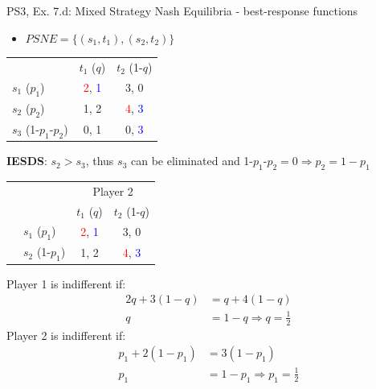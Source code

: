 \begin{frame}{PS3, Ex. 7.d: Mixed Strategy Nash Equilibria - best-response functions}
  \begin{multicols}{2}
    \begin{itemize}
      \item[(d)] $PSNE=\{(s_1,t_1),(s_2,t_2)\}$
    \end{itemize}
    \vspace{-8pt}
    \begin{table}
      \begin{tabular}{l|c|c|}
          \multicolumn{1}{c}{}  & \multicolumn{1}{c}{$t_1$ ($q$)} & \multicolumn{1}{c}{$t_2$ (1-$q$)} \\\cline{2-3}
          $s_1$ ($p_1$)         & \textcolor{red}{2}, \textcolor{blue}{1} & 3, 0 \\\cline{2-3}
          $s_2$ ($p_2$)         & 1, 2 & \textcolor{red}{4}, \textcolor{blue}{3} \\\cline{2-3}
          $s_3$ (1-$p_1$-$p_2$) & 0, 1 & 0, \textcolor{blue}{3} \\\cline{2-3}
      \end{tabular}
    \end{table}
    \vspace{-2pt}
    \textbf{IESDS}: $s_2>s_3$, thus $s_3$ can be eliminated and 1-$p_1$-$p_2=0\Rightarrow p_2=1-p_1$
    \vspace{-6pt}
    \begin{table}
      \begin{tabular}{cl|c|c|}
        & \multicolumn{1}{c}{} & \multicolumn{2}{c}{\color{blue}Player 2}\\
        \parbox[t]{1mm}{}
        &   &  &  \\
        & $s_1$ ($p_1$)  & \textcolor{red}{2}, \textcolor{blue}{1} & 3, 0 \\
        & $s_2$ (1-$p_1$)& 1, 2 & \textcolor{red}{4}, \textcolor{blue}{3} \\
      \end{tabular}
    \end{table}
    Player 1 is indifferent if:
    \begin{align*}
      2q+3(1-q) &= q+4(1-q) \\
      q &= 1-q \Rightarrow q = \frac{1}{2}
    \end{align*}
    Player 2 is indifferent if:
    \begin{align*}
      p_1 + 2(1-p_1)  &= 3(1-p_1) \\
      p_1             &= 1-p_1 \Rightarrow p_1 = \frac{1}{2}
    \end{align*}
  \vfill\null \columnbreak
  \vfill\null
  \end{multicols}
\end{frame}
